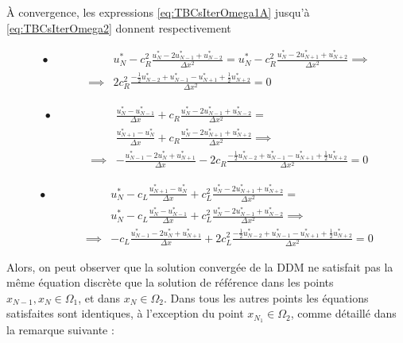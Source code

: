 \indent À convergence, les expressions \eqref{eq:TBCsIterOmega1A} jusqu'à \eqref{eq:TBCsIterOmega2} donnent respectivement 


\begin{equation*}
    \label{eq:TBCsCVOmega1A}
\begin{aligned}
   \bullet \qquad && 			    &u_N^* - c_R^2 \frac{u_N^* - 2u_{N-1}^* + u_{N-2}^*}{\Delta x^2} = u_N^* - c_R^2 \frac{u_N^* - 2u_{N+1}^* + u_{N+2}^*}{\Delta x^2} \implies  \\
    && \implies & 2c_R^2 \frac{-\frac{1}{2}u_{N-2}^* + u_{N-1}^* - u_{N+1}^* + \frac{1}{2}u_{N+2}^* }{\Delta x^2} = 0
    \end{aligned}
    \end{equation*}
    
\begin{equation*}
    \label{eq:TBCsCVOmega1B}
\begin{aligned}
    \bullet \qquad &&             &\frac{u_N^* - u_{N-1}^*}{\Delta x} + c_R \frac{u_N^* - 2u_{N-1}^* + u_{N-2}^*}{\Delta x^2} = \\
    && 			   &\frac{u_{N+1}^* - u_{N}^*}{\Delta x} + c_R \frac{u_N^* - 2u_{N+1}^* + u_{N+2}^*}{\Delta x^2} \implies \\
    && \implies & -\frac{u_{N-1}^* - 2 u_{N}^* + u_{N+1}^*}{\Delta x} - 2c_R\frac{-\frac{1}{2}u_{N-2}^* + u_{N-1}^* - u_{N+1}^* + \frac{1}{2}u_{N+2}^* }{\Delta x^2} = 0 
\end{aligned}
\end{equation*}

\begin{equation*}
    \label{eq:TBCsCVOmega2}
\begin{aligned}
   \bullet \qquad && 					&	 u_N^* -  c_L\frac{u_{N+1}^* - u_{N}^*}{\Delta x} + c_L^2 \frac{u_{N}^* - 2u_{N+1}^* + u_{N+2}^*}{\Delta x^2} =  \\
   && 					& u_N^* -  c_L\frac{u_{N}^* - u_{N-1}^*}{\Delta x} + c_L^2 \frac{u_{N}^* - 2u_{N-1}^* + u_{N-2}^*}{\Delta x^2} \implies \\
	&&  \implies	    & -c_L\frac{u_{N-1}^* - 2 u_{N}^* + u_{N+1}^*}{\Delta x} + 2c_L^2\frac{-\frac{1}{2}u_{N-2}^* + u_{N-1}^* - u_{N+1}^* + \frac{1}{2}u_{N+2}^* }{\Delta x^2} = 0 
\end{aligned}
\end{equation*}

\indent Alors, on peut observer que la solution convergée de la DDM ne satisfait pas la même équation discrète que la solution de référence dans les points $x_{N-1}, x_N \in \Omega_1$, et dans $x_N\in \Omega_2$. Dans tous les autres points les équations satisfaites sont identiques, à l'exception du point $x_{N_1} \in \Omega_2$, comme détaillé dans la remarque suivante :

